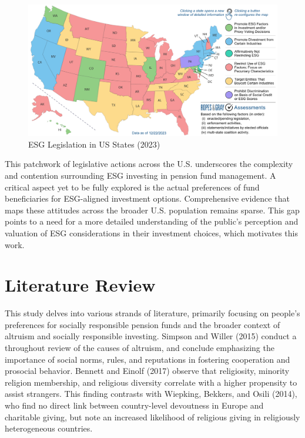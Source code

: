 \documentclass[
  12pt,
]{article}
\begin{document}
\begin{figure}

{\centering \includegraphics[width=1\textwidth]{ropesandgrey} 

}

\caption{ESG Legislation in US States (2023)}\label{fig:mapplot}
\end{figure}

This patchwork of legislative actions across the U.S. underscores the complexity and contention surrounding ESG investing in pension fund management. A critical aspect yet to be fully explored is the actual preferences of fund beneficiaries for ESG-aligned investment options. Comprehensive evidence that maps these attitudes across the broader U.S. population remains sparse. This gap points to a need for a more detailed understanding of the public's perception and valuation of ESG considerations in their investment choices, which motivates this work.

\hypertarget{literature-review}{%
\section{Literature Review}\label{literature-review}}

This study delves into various strands of literature, primarily focusing on people's preferences for socially responsible pension funds and the broader context of altruism and socially responsible investing. Simpson and Willer (2015) conduct a throughout review of the causes of altruism, and conclude emphasizing the importance of social norms, rules, and reputations in fostering cooperation and prosocial behavior. Bennett and Einolf (2017) observe that religiosity, minority religion membership, and religious diversity correlate with a higher propensity to assist strangers. This finding contrasts with Wiepking, Bekkers, and Osili (2014), who find no direct link between country-level devoutness in Europe and charitable giving, but note an increased likelihood of religious giving in religiously heterogeneous countries.
\end{document}
